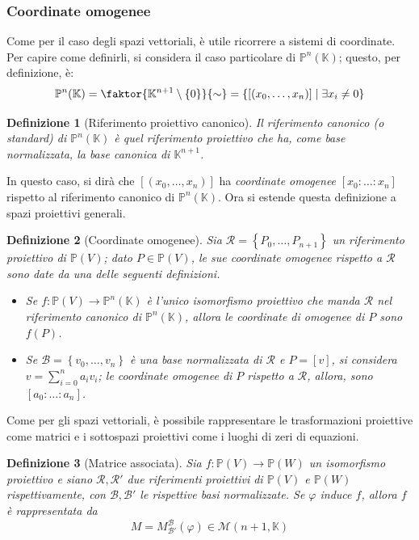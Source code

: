 \documentclass[12pt]{scrartcl}
\theoremstyle{style}
\newtheorem{definizione}{Definizione}[section]
\numberwithin{equation}{subsection}
\begin{document}
\subsubsection{Coordinate omogenee}
Come per il caso degli spazi vettoriali, \`e utile ricorrere a sistemi di coordinate.
Per capire come definirli, si considera il caso particolare di $\mathbb{P}^n(\mathbb{K})$; questo, per definizione, \`e:
\[
	\mathbb{P}^n(\mathbb{K}) = \faktor{\mathbb{K}^{n+1} \setminus\left\{ 0 \right\} }{\sim} = \left\{ [(x_0,\ldots,x_n)]  \mid \exists x_i \neq 0 \right\} 
\] 
\begin{definizione}
	[Riferimento proiettivo canonico]
	Il \textit{riferimento canonico} (o standard) di $\mathbb{P}^n(\mathbb{K})$ \`e quel riferimento proiettivo che ha, come base normalizzata, la base canonica di $\mathbb{K}^{n+1} $.
\end{definizione}
\noindent In questo caso, si dir\`a che $[(x_0,\ldots,x_n)]$ ha \textit{coordinate omogenee} $[x_0:\ldots :x_n]$ rispetto al riferimento canonico di $\mathbb{P}^n(\mathbb{K})$.
Ora si estende questa definizione a spazi proiettivi generali.
\begin{definizione}
	[Coordinate omogenee]
	Sia $\mathcal{R} = \left\{ P_0,\ldots,P_{n+1}  \right\} $ un riferimento proiettivo di $\mathbb{P}(V)$; dato $P \in \mathbb{P}(V)$, le sue \textit{coordinate omogenee} rispetto a $\mathcal{R} $ sono date da una delle seguenti definizioni.
	\begin{itemize}
		\item Se $f:\mathbb{P}(V)\to \mathbb{P}^n(\mathbb{K})$ \`e l'unico isomorfismo proiettivo che manda $\mathcal{R} $ nel riferimento canonico di $\mathbb{P}^n(\mathbb{K})$, allora le coordinate di omogenee di $P$ sono $f(P)$.
		\item Se $\mathcal{B} = \left\{ v_0, \ldots ,v_n\right\} $ \`e una base normalizzata di $\mathcal{R} $ e $P = [v]$, si considera $v = \sum_{i=0}^{n} a_i v_i$; le coordinate omogenee di $P$ rispetto a $\mathcal{R}$, allora, sono $[a_0:\ldots:a_n]$.
	\end{itemize}
\end{definizione}
\noindent Come per gli spazi vettoriali, \`e possibile rappresentare le trasformazioni proiettive come matrici e i sottospazi proiettivi come i luoghi di zeri di equazioni.
\begin{definizione}
	[Matrice associata]
Sia $f:\mathbb{P}(V) \to \mathbb{P}(W)$ un isomorfismo proiettivo e siano $\mathcal{R} , \mathcal{R} '$ due riferimenti proiettivi di $\mathbb{P}(V)$ e $\mathbb{P}(W)$ rispettivamente, con $\mathcal{B} ,\mathcal{B} '$ le rispettive basi normalizzate.
Se $\varphi $ induce $f$, allora $f$ \`e rappresentata da 
\[
M = M_{\mathcal{B} '} ^{\mathcal{B} } (\varphi ) \in \mathcal{M} (n+1,\mathbb{K})
\] 
\end{definizione}
\end{document}
